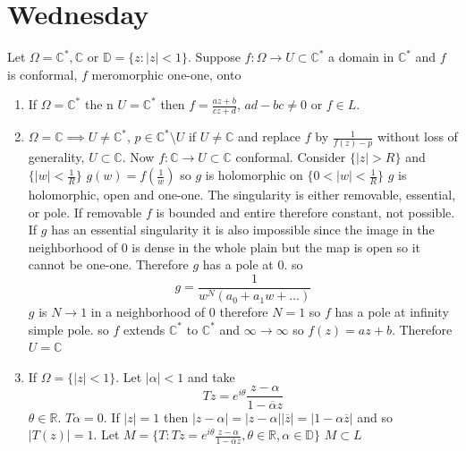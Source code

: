 \documentclass[11pt]{article}
\begin{document}
\section{Wednesday}
Let $\Omega = \mathbb{C}^{*}, \mathbb{C}$ or $ \mathbb{D} = \{z : |z| < 1\}$.
Suppose  $f : \Omega \rightarrow U \subset \mathbb{C}^{*}$ a domain in $ \mathbb{C}^{*}$ and $f$ is conformal,  $f$ meromorphic one-one,  onto
\begin{enumerate}
    \item If $\Omega = \mathbb{C}^{*}$ the n $U = \mathbb{C}^{*}$ then $f = \frac{az + b}{cz  +d}$, $ad -bc \ne 0$ or  $f \in L$.
    \item  $\Omega = \mathbb{C} \implies U \ne \mathbb{C}^{*}$, $p \in  \mathbb{C}^{*} \setminus U$ if $U \ne \mathbb{C}$
        and replace $f$ by $\frac{1}{f(z) - p}$ without loss of generality, $U \subset \mathbb{C}$.
        Now $f : \mathbb{C} \rightarrow U \subset \mathbb{C}$ conformal.
        Consider $\{|z| > R\}$ and  $\{|w| < \frac{1}{R}\}$ $g(w) = f(\frac{1}{w})$ so $g$ is holomorphic on  $\{0 < |w| < \frac{1}{R}\}$ 
        $g$ is holomorphic, open and one-one. The singularity is either removable, essential, or pole. If removable $f$ is bounded and entire therefore constant, not possible.
        If $g$ has an essential singularity it is also impossible since the image in the neighborhood of 0 is dense in the whole plain but the map is open so it cannot be one-one.
        Therefore $g$ has a pole at 0. so
        \[
        g = \frac{1}{w^{N}(a_0 +a_1w + \dots )}
        \] 
        $g$ is $N \to 1$ in a neighborhood of  $0$ therefore $N = 1$ so  $f$ has a pole at infinity simple pole. so $f$ extends  $ \mathbb{C}^{*}$ to $ \mathbb{C}^{*}$ and $\infty \rightarrow \infty$
        so $f(z) = az + b$. Therefore $U  = \mathbb{C}$ 
    \item If $\Omega = \{|z| < 1\}$. Let  $|\alpha| < 1$ and take
        \[
        Tz = e^{i \theta} \frac{z -\alpha}{1-\overline{\alpha}z}
        \] 
        $\theta \in \mathbb{R}$.
        $T\alpha = 0$.
        If $|z| = 1$ then  $|z-\alpha| = |z-\alpha||\overline{z}| = |1- \alpha \overline{ z}|$ and so $ |T(z)| = 1$.
        Let  $M = \{T : Tz = e^{i\theta}\frac{z-\alpha}{1-\overline{\alpha}z}, \theta \in \mathbb{R}, \alpha \in \mathbb{D}\}$
        $M \subset L$
\end{enumerate}
\end{document}

